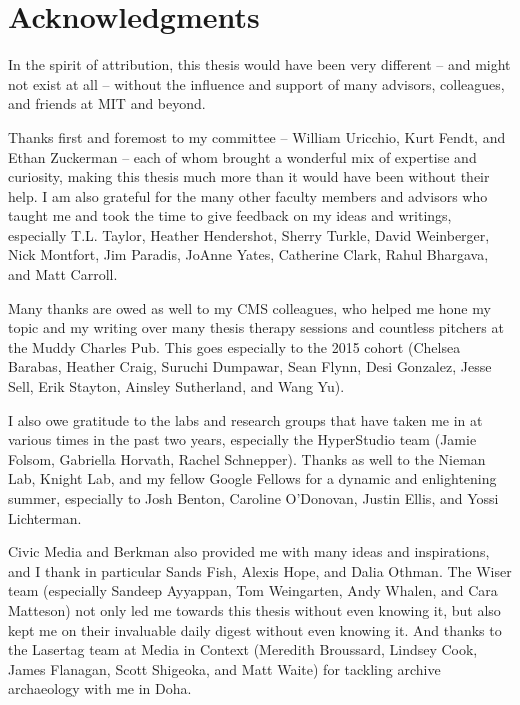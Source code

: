 % 

\cleardoublepage

\section*{Acknowledgments}

In the spirit of attribution, this thesis would have been very different -- and might not exist at all -- without the influence and support of many advisors, colleagues, and friends at MIT and beyond.

Thanks first and foremost to my committee -- William Uricchio, Kurt Fendt, and Ethan Zuckerman -- each of whom brought a wonderful mix of expertise and curiosity, making this thesis much more than it would have been without their help. I am also grateful for the many other faculty members and advisors who taught me and took the time to give feedback on my ideas and writings, especially T.L. Taylor, Heather Hendershot, Sherry Turkle, David Weinberger, Nick Montfort, Jim Paradis, JoAnne Yates, Catherine Clark, Rahul Bhargava, and Matt Carroll.

Many thanks are owed as well to my CMS colleagues, who helped me hone my topic and my writing over many thesis therapy sessions and countless pitchers at the Muddy Charles Pub. This goes especially to the 2015 cohort (Chelsea Barabas, Heather Craig, Suruchi Dumpawar, Sean Flynn, Desi Gonzalez, Jesse Sell, Erik Stayton, Ainsley Sutherland, and Wang Yu).

I also owe gratitude to the labs and research groups that have taken me in at various times in the past two years, especially the HyperStudio team (Jamie Folsom, Gabriella Horvath, Rachel Schnepper). Thanks as well to the Nieman Lab, Knight Lab, and my fellow Google Fellows for a dynamic and enlightening summer, especially to Josh Benton, Caroline O'Donovan, Justin Ellis, and Yossi Lichterman.

Civic Media and Berkman also provided me with many ideas and inspirations, and I thank in particular Sands Fish, Alexis Hope, and Dalia Othman. The Wiser team (especially Sandeep Ayyappan, Tom Weingarten, Andy Whalen, and Cara Matteson) not only led me towards this thesis without even knowing it, but also kept me on their invaluable daily digest without even knowing it. And thanks to the Lasertag team at Media in Context (Meredith Broussard, Lindsey Cook, James Flanagan, Scott Shigeoka, and Matt Waite) for tackling archive archaeology with me in Doha.

